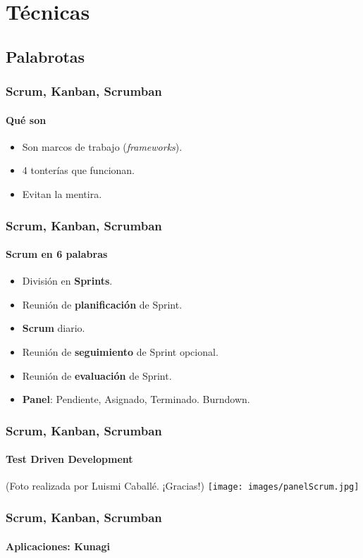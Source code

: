  \section{Técnicas}

  \subsection{Palabrotas}

  \begin{frame}
   \frametitle{Scrum, Kanban, Scrumban}
   \framesubtitle{Qué son}

   \begin{itemize}
    \item Son marcos de trabajo (\textit{frameworks}).
    \item 4 tonterías que funcionan.
    \item Evitan la mentira.
   \end{itemize}
  \end{frame}

  \begin{frame}
   \frametitle{Scrum, Kanban, Scrumban}
   \framesubtitle{Scrum en 6 palabras}

   \begin{itemize}
    \item División en \textbf{Sprints}.
    \item Reunión de \textbf{planificación} de Sprint.
    \item \textbf{Scrum} diario.
    \item Reunión de \textbf{seguimiento} de Sprint opcional.
    \item Reunión de \textbf{evaluación} de Sprint.
    \item \textbf{Panel}: Pendiente, Asignado, Terminado. Burndown.
   \end{itemize}
  \end{frame}

  \begin{frame}
   \frametitle{Scrum, Kanban, Scrumban}
   \framesubtitle{Test Driven Development}

   \begin{center}
    {\small (Foto realizada por Luismi Caballé. ¡Gracias!)}
    \texttt{[image: images/panelScrum.jpg]}
   \end{center}
  \end{frame}

  \begin{frame}
   \frametitle{Scrum, Kanban, Scrumban}
   \framesubtitle{Aplicaciones: Kunagi}

   \begin{center}
   \end{center}

  \end{frame}

